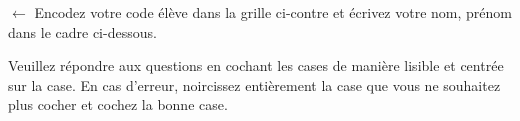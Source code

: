 
\setlength{\parindent}{0pt}\hspace*{\fill}%
\begin{minipage}[c]{.45\linewidth}
    \vspace{1em}
    \vspace*{2mm}
    
\end{minipage}
\begin{minipage}[c]{.45\linewidth}
    \vspace{0.5cm}
    $\longleftarrow{}$\hspace{0pt plus 1cm} Encodez votre code
    élève dans la grille ci-contre et écrivez votre nom, prénom
    dans le cadre ci-dessous.
    
    \vspace{3ex}
    
    \hfill{}
\end{minipage}


Veuillez répondre aux questions en cochant les cases de manière lisible et centrée sur la case. 
En cas d'erreur, noircissez entièrement la case que vous ne souhaitez plus cocher et cochez la bonne case.
